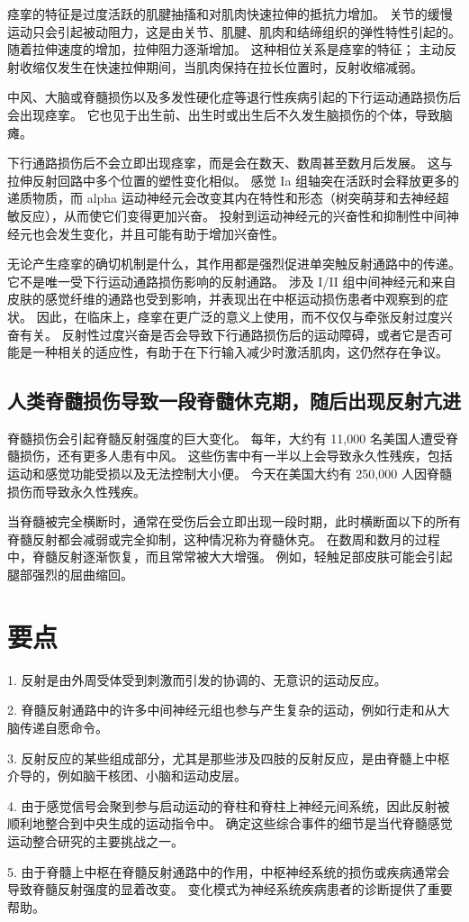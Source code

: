痉挛的特征是过度活跃的肌腱抽搐和对肌肉快速拉伸的抵抗力增加。
关节的缓慢运动只会引起被动阻力，这是由关节、肌腱、肌肉和结缔组织的弹性特性引起的。
随着拉伸速度的增加，拉伸阻力逐渐增加。
这种相位关系是痉挛的特征；
主动反射收缩仅发生在快速拉伸期间，当肌肉保持在拉长位置时，反射收缩减弱。


中风、大脑或脊髓损伤以及多发性硬化症等退行性疾病引起的下行运动通路损伤后会出现痉挛。
它也见于出生前、出生时或出生后不久发生脑损伤的个体，导致脑瘫。


下行通路损伤后不会立即出现痉挛，而是会在数天、数周甚至数月后发展。
这与拉伸反射回路中多个位置的塑性变化相似。
感觉 Ia 组轴突在活跃时会释放更多的递质物质，而 alpha 运动神经元会改变其内在特性和形态（树突萌芽和去神经超敏反应），从而使它们变得更加兴奋。
投射到运动神经元的兴奋性和抑制性中间神经元也会发生变化，并且可能有助于增加兴奋性。


无论产生痉挛的确切机制是什么，其作用都是强烈促进单突触反射通路中的传递。
它不是唯一受下行运动通路损伤影响的反射通路。
涉及 I/II 组中间神经元和来自皮肤的感觉纤维的通路也受到影响，并表现出在中枢运动损伤患者中观察到的症状。
因此，在临床上，痉挛在更广泛的意义上使用，而不仅仅与牵张反射过度兴奋有关。
反射性过度兴奋是否会导致下行通路损伤后的运动障碍，或者它是否可能是一种相关的适应性，有助于在下行输入减少时激活肌肉，这仍然存在争议。



\subsection{人类脊髓损伤导致一段脊髓休克期，随后出现反射亢进}

脊髓损伤会引起脊髓反射强度的巨大变化。
每年，大约有 11,000 名美国人遭受脊髓损伤，还有更多人患有中风。
这些伤害中有一半以上会导致永久性残疾，包括运动和感觉功能受损以及无法控制大小便。
今天在美国大约有 250,000 人因脊髓损伤而导致永久性残疾。


当脊髓被完全横断时，通常在受伤后会立即出现一段时期，此时横断面以下的所有脊髓反射都会减弱或完全抑制，这种情况称为脊髓休克。
在数周和数月的过程中，脊髓反射逐渐恢复，而且常常被大大增强。
例如，轻触足部皮肤可能会引起腿部强烈的屈曲缩回。



\section{要点}

1. 反射是由外周受体受到刺激而引发的协调的、无意识的运动反应。


2. 脊髓反射通路中的许多中间神经元组也参与产生复杂的运动，例如行走和从大脑传递自愿命令。


3. 反射反应的某些组成部分，尤其是那些涉及四肢的反射反应，是由脊髓上中枢介导的，例如脑干核团、小脑和运动皮层。


4. 由于感觉信号会聚到参与启动运动的脊柱和脊柱上神经元间系统，因此反射被顺利地整合到中央生成的运动指令中。
确定这些综合事件的细节是当代脊髓感觉运动整合研究的主要挑战之一。


5. 由于脊髓上中枢在脊髓反射通路中的作用，中枢神经系统的损伤或疾病通常会导致脊髓反射强度的显着改变。
变化模式为神经系统疾病患者的诊断提供了重要帮助。
